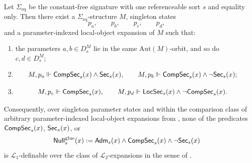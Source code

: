 \begin{theorem}\label{thm:pointwise-irreducibility}
Let $\Sigma_{\mathrm{eq}}$ be the constant-free signature with one referenceable sort $s$ and equality only. Then there exist a $\Sigma_{\mathrm{eq}}$-structure $M$, singleton states
\[
p_a,\qquad p_b,\qquad p_c,\qquad p_d,
\]
and a parameter-indexed local-object expansion of $M$ such that:
\begin{enumerate}[label=(\roman*),nosep]
\item the parameters $a,b\in D_s^M$ lie in the same $\mathrm{Aut}(M)$-orbit, and so do $c,d\in D_s^M$;
\item
\[
M,p_a\Vdash \mathsf{CompSec}_s(x)\land \mathsf{Sec}_s(x),
\qquad
M,p_b\Vdash \mathsf{CompSec}_s(x)\land \neg\mathsf{Sec}_s(x);
\]
\item
\[
M,p_c\Vdash \mathsf{CompSec}_s(x),
\qquad
M,p_d\Vdash \mathsf{LocSec}_s(x)\land \neg\mathsf{CompSec}_s(x).
\]
\end{enumerate}
Consequently, over singleton parameter states and within the comparison class of arbitrary parameter-indexed local-object expansions from , none of the predicates $\mathsf{CompSec}_s(x)$, $\mathsf{Sec}_s(x)$, or
\[
\mathsf{Null}^{\mathrm{glue}}_s(x):=\mathsf{Adm}_s(x)\land \mathsf{CompSec}_s(x)\land \neg\mathsf{Sec}_s(x)
\]
is $\mathcal L_1$-definable over the class of $\mathcal L_2$-expansions in the sense of .
\end{theorem}

